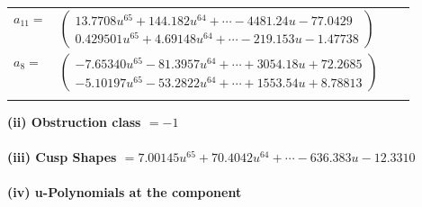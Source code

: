 \documentclass[1p]{elsarticle_modified}
\theoremstyle{definition}
\begin{document}
\begin{tabular}{m{7pt} m{180pt} m{7pt} m{180pt} }
\flushright $a_{11}=$&$\begin{pmatrix}13.7708 u^{65}+144.182 u^{64}+\cdots-4481.24 u-77.0429\\0.429501 u^{65}+4.69148 u^{64}+\cdots-219.153 u-1.47738\end{pmatrix}$ \\
\flushright $a_{8}=$&$\begin{pmatrix}-7.65340 u^{65}-81.3957 u^{64}+\cdots+3054.18 u+72.2685\\-5.10197 u^{65}-53.2822 u^{64}+\cdots+1553.54 u+8.78813\end{pmatrix}$\\&\end{tabular}
\flushleft \textbf{(ii) Obstruction class $= -1$}\\~\\
\flushleft \textbf{(iii) Cusp Shapes $= 7.00145 u^{65}+70.4042 u^{64}+\cdots-636.383 u-12.3310$}\\~\\
\newpage\renewcommand{\arraystretch}{1}
\flushleft \textbf{(iv) u-Polynomials at the component}\newline \\
\end{document}
